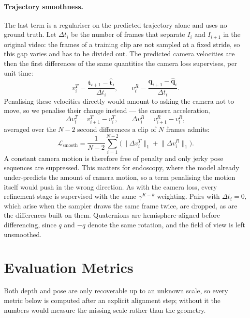 \documentclass[11pt]{article}
\begin{document}
\paragraph{Trajectory smoothness.}
The last term is a regulariser on the predicted trajectory alone and uses no ground truth.
Let $\Delta t_i$ be the number of frames that separate $I_i$ and $I_{i+1}$ in the original
video: the frames of a training clip are not sampled at a fixed stride, so this gap varies and
has to be divided out. The predicted camera velocities are then the first differences of the
same quantities the camera loss supervises, per unit time:
\begin{equation}
  v^{T}_i = \frac{\hat{\mathbf{t}}_{i+1} - \hat{\mathbf{t}}_i}{\Delta t_i},
  \qquad
  v^{R}_i = \frac{\hat{\mathbf{q}}_{i+1} - \hat{\mathbf{q}}_i}{\Delta t_i} .
\end{equation}
Penalising these velocities directly would amount to asking the camera not to move, so we
penalise their change instead --- the camera acceleration,
\begin{equation}
  \Delta v^{T}_i = v^{T}_{i+1} - v^{T}_i,
  \qquad
  \Delta v^{R}_i = v^{R}_{i+1} - v^{R}_i ,
\end{equation}
averaged over the $N-2$ second differences a clip of $N$ frames admits:
\begin{equation}
  \mathcal{L}_{\text{smooth}}
  = \frac{1}{N-2} \sum_{i=1}^{N-2}
    \Big( \big\| \Delta v^{T}_i \big\|_{1} + \big\| \Delta v^{R}_i \big\|_{1} \Big) .
\end{equation}
A constant camera motion is therefore free of penalty and only jerky pose sequences are
suppressed. This matters for endoscopy, where the model already under-predicts the amount of
camera motion, so a term penalising the motion itself would push in the wrong direction. As
with the camera loss, every refinement stage is supervised with the same $\gamma^{K-k}$
weighting. Pairs with $\Delta t_i = 0$, which arise when the sampler draws the same frame twice, are
dropped, as are the differences built on them. Quaternions are hemisphere-aligned before
differencing, since $q$ and $-q$ denote the same rotation, and the field of view is left
unsmoothed.

\section*{Evaluation Metrics}

Both depth and pose are only recoverable up to an unknown scale, so every metric below is
computed after an explicit alignment step; without it the numbers would measure the missing
scale rather than the geometry.
\end{document}
